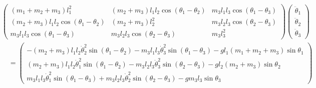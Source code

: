 \documentclass[11pt,a4paper]{article}
\begin{document}
$$
\begin{aligned}
    &\begin{pmatrix}
        (m_1 + m_2 + m_3) l_1^2 & (m_2 + m_3) l_1 l_2 \cos(\theta_1 - \theta_2) & m_3 l_1 l_3 \cos(\theta_1 - \theta_3) \\[1ex]
        (m_2 + m_3) l_1 l_2 \cos(\theta_1 - \theta_2) & (m_2 + m_3) l_2^2 & m_3 l_2 l_3 \cos(\theta_2 - \theta_3) \\[1ex]
        m_3 l_1 l_3 \cos(\theta_1 - \theta_3) & m_3 l_2 l_3 \cos(\theta_2 - \theta_3) & m_3 l_3^2 
    \end{pmatrix}
    \begin{pmatrix}
        \ddot{\theta}_1 \\[1ex]
        \ddot{\theta}_2 \\[1ex]
        \ddot{\theta}_3
    \end{pmatrix} \\[2ex]
    &\quad = 
    \begin{pmatrix}
        -(m_2 + m_3) l_1 l_2 \dot{\theta}_2^2 \sin(\theta_1 - \theta_2) - m_3 l_1 l_3 \dot{\theta}_3^2 \sin(\theta_1 - \theta_3) - g l_1 (m_1 + m_2 + m_3) \sin\theta_1 \\[1ex]
        (m_2 + m_3) l_1 l_2 \dot{\theta}_1^2 \sin(\theta_1 - \theta_2) - m_3 l_2 l_3 \dot{\theta}_3^2 \sin(\theta_2 - \theta_3) - g l_2 (m_2 + m_3) \sin\theta_2 \\[1ex]
        m_3 l_1 l_3 \dot{\theta}_1^2 \sin(\theta_1 - \theta_3) + m_3 l_2 l_3 \dot{\theta}_2^2 \sin(\theta_2 - \theta_3) - g m_3 l_3 \sin\theta_3
    \end{pmatrix}
\end{aligned}
$$
\end{document}
